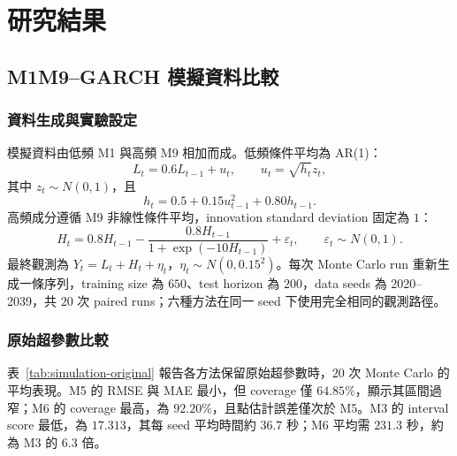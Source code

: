\section{研究結果}
\label{sec:results}

\subsection{M1M9--GARCH 模擬資料比較}
\label{subsec:simulation-results}

\subsubsection{資料生成與實驗設定}

模擬資料由低頻 M1 與高頻 M9 相加而成。低頻條件平均為 AR(1)：
\[
    L_t=0.6L_{t-1}+u_t,
    \qquad
    u_t=\sqrt{h_t}z_t,
\]
其中 $z_t\sim N(0,1)$，且
\[
    h_t=0.5+0.15u_{t-1}^{2}+0.80h_{t-1}.
\]
高頻成分遵循 M9 非線性條件平均，innovation standard deviation 固定為 $1$：
\[
    H_t=0.8H_{t-1}
    -\frac{0.8H_{t-1}}{1+\exp(-10H_{t-1})}
    +\varepsilon_t,
    \qquad \varepsilon_t\sim N(0,1).
\]
最終觀測為 $Y_t=L_t+H_t+\eta_t$，$\eta_t\sim N(0,0.15^2)$。每次 Monte Carlo run 重新生成一條序列，training size 為 $650$、test horizon 為 $200$，data seeds 為 2020--2039，共 $20$ 次 paired runs；六種方法在同一 seed 下使用完全相同的觀測路徑。

\subsubsection{原始超參數比較}

表~\ref{tab:simulation-original} 報告各方法保留原始超參數時，$20$ 次 Monte Carlo 的平均表現。M5 的 RMSE 與 MAE 最小，但 coverage 僅 $64.85\%$，顯示其區間過窄；M6 的 coverage 最高，為 $92.20\%$，且點估計誤差僅次於 M5。M3 的 interval score 最低，為 $17.313$，其每 seed 平均時間約 $36.7$ 秒；M6 平均需 $231.3$ 秒，約為 M3 的 $6.3$ 倍。


